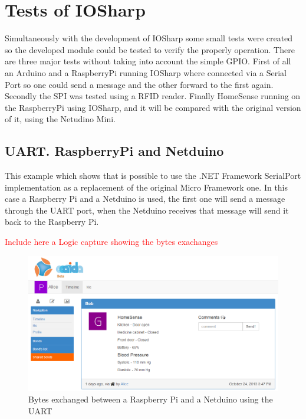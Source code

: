 \chapter{Tests of IOSharp}\label{C:IOSharp Implementation}
Simultaneously with the development of IOSharp some small tests were created so the developed module could be tested to verify the properly operation. There are three major tests without taking into account the simple GPIO. First of all an Arduino and a RaspberryPi running IOSharp where connected via a Serial Port so one could send a message and the other forward to the first again.  Secondly the SPI was tested using a RFID reader. Finally HomeSense running on the RaspberryPi using IOSharp, and it will be compared with the original version of it, using the Netudino Mini.

\section{UART. RaspberryPi and Netduino}\label{S:IOEx-UART}
This example which shows that is possible to use the .NET Framework SerialPort implementation as a replacement of the original Micro Framework one. In this case a Raspberry Pi and a Netduino is used, the first one will send a message through the UART port, when the Netduino receives that message will send it back to the Raspberry Pi.

\textcolor{red}{Include here a Logic capture showing the bytes exachanges}

\begin{figure}[H]\begin{center}
 \centering
  \captionsetup{justification=centering}
  \includegraphics[width=1\textwidth]{pictures/proposal/aaaida-use-case}
  \caption{Bytes exchanged between a Raspberry Pi and a Netduino using the UART \label{fig:IOEx-UART}}
\end{center}\end{figure}

